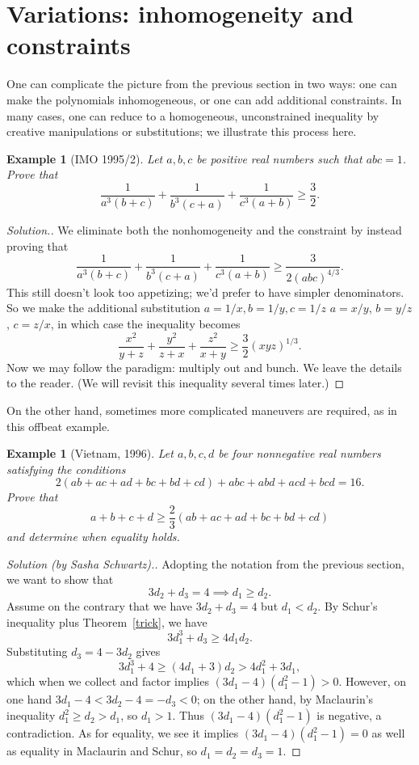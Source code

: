 \documentclass[12pt]{report}
\newtheorem{problem}[theorem]{Example}
\numberwithin{exc}{section}
\begin{document}
\section{Variations: inhomogeneity and constraints}
One can complicate the picture from the previous section in two ways: 
one can make the polynomials inhomogeneous, or one can add 
additional constraints. In many cases, one can reduce to a 
homogeneous, unconstrained inequality by creative manipulations or 
substitutions; we illustrate this process here.

\begin{problem}[IMO 1995/2] \label{imo1995}
Let $a,b,c$ be 
positive real numbers such that $abc = 1$. Prove that
\[
\frac{1}{a^{3}(b+c)} + \frac{1}{b^{3}(c+a)} + \frac{1}{c^{3}(a+b)} 
\geq \frac{3}{2}.
\]
\end{problem}
\begin{proof}[Solution.]
We eliminate both the nonhomogeneity and the constraint by instead 
proving that
\[
\frac{1}{a^{3}(b+c)} + \frac{1}{b^{3}(c+a)} + \frac{1}{c^{3}(a+b)} 
\geq \frac{3}{2(abc)^{4/3}}.
\]
This still doesn't look too appetizing; we'd prefer to have simpler
denominators. So we make the additional substitution $a = 1/x, b = 
1/y, c = 1/z$
$a = x/y$, $b = y/z$, $c = z/x$, in which case the inequality becomes
\begin{equation} \label{imo95}
\frac{x^{2}}{y+z} + \frac{y^{2}}{z+x} + \frac{z^{2}}{x+y} \geq 
\frac{3}{2}(xyz)^{1/3}.
\end{equation}
Now we may follow the paradigm: multiply out and bunch. We leave the 
details to the reader. (We will revisit this inequality several times 
later.)
\end{proof}

On the other hand, sometimes more complicated maneuvers are required,
as in this offbeat example.
\begin{problem}[Vietnam, 1996]
Let $a,b,c,d$ be four nonnegative real numbers satisfying the 
conditions
\[
2(ab+ac+ad+bc+bd+cd) + abc + abd + acd + bcd = 16.
\]
Prove that
\[
a+b+c+d \geq \frac 23 (ab+ac+ad+bc+bd+cd)
\]
and determine when equality holds.
\end{problem}
\begin{proof}[Solution (by Sasha Schwartz).]
Adopting the notation from the previous section, we want to show that
\[
3d_{2} + d_{3} = 4 \implies d_{1} \geq d_{2}.
\]
Assume on the contrary that we have $3d_2 + d_3 = 4$ but $d_1 < d_2$.
By Schur's inequality plus Theorem~\ref{trick}, we have
\[
3d_1^3 + d_3 \geq 4d_1 d_2.
\]
Substituting $d_3 = 4-3d_2$ gives
\[
3d_1^3 + 4 \geq (4d_1 + 3)d_2 > 4d_1^2 + 3d_1,
\]
which when we collect and factor implies $(3d_1-4)(d_1^2-1) > 0$.
However, on one hand $3d_1 - 4 < 3d_2 - 4 = -d_3 < 0$; on the
other hand, by Maclaurin's inequality $d_1^2 \geq d_2 > d_1$, so
$d_1 > 1$. Thus $(3d_1 - 4)(d_1^2-1)$ is negative,
a contradiction. As for equality, we see it implies $(3d_1 
-4)(d_1^2-1) = 0$ as well as equality in Maclaurin and Schur, so 
$d_1 = d_2 = d_3 = 1$.
\end{proof}
\end{document}
